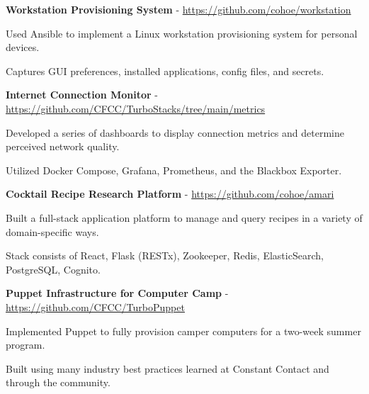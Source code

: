 \documentclass[10pt]{article}
\newcommand{\halfblankline}{\quad\vspace{-0.5\baselineskip}\pagebreak[3]}
\begin{document}
\textbf{Workstation Provisioning System} - \href{https://github.com/cohoe/workstation}{https://github.com/cohoe/workstation}
\begin{outerlist}
    \item[]
            \begin{innerlist}
	\item Used Ansible to implement a Linux workstation provisioning system for personal devices.
	\item Captures GUI preferences, installed applications, config files, and secrets.
            \end{innerlist}
\end{outerlist}
\halfblankline

\textbf{Internet Connection Monitor} - \href{https://github.com/CFCC/TurboStacks/tree/main/metrics}{https://github.com/CFCC/TurboStacks/tree/main/metrics}
\begin{outerlist}
    \item[]
            \begin{innerlist}
		\item Developed a series of dashboards to display connection metrics and determine perceived network quality.
                \item Utilized Docker Compose, Grafana, Prometheus, and the Blackbox Exporter.
            \end{innerlist}
\end{outerlist}
\halfblankline

\textbf{Cocktail Recipe Research Platform} - \href{https://github.com/cohoe/amari}{https://github.com/cohoe/amari}
\begin{outerlist}
    \item[]
            \begin{innerlist}
                \item Built a full-stack application platform to manage and query recipes in a variety of domain-specific ways.
                \item Stack consists of React, Flask (RESTx), Zookeeper, Redis, ElasticSearch, PostgreSQL, Cognito.
            \end{innerlist}
\end{outerlist}
\halfblankline

\textbf{Puppet Infrastructure for Computer Camp} - \href{https://github.com/CFCC/TurboPuppet}{https://github.com/CFCC/TurboPuppet}
\begin{outerlist}
    \item[]
            \begin{innerlist}
                \item Implemented Puppet to fully provision camper computers for a two-week summer program.
		 \item Built using many industry best practices learned at Constant Contact and through the community.
            \end{innerlist}
\end{outerlist}
\halfblankline
\end{document}
